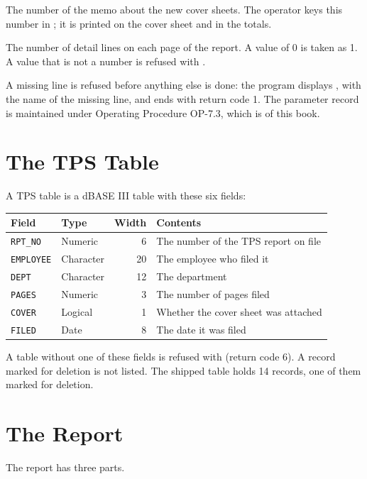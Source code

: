 The number of the memo about the new cover sheets.  The
operator keys this number in ; it is printed on the cover sheet
and in the totals.

The number of detail lines on each page of the report.
A value of 0 is taken as 1.  A value that is not a number is refused
with .

A missing line is refused before anything else is done: the program
displays , with the name of the missing line, and
ends with return code 1.  The parameter record is maintained under
Operating Procedure OP-7.3, which is  of this book.

\section{The TPS Table}
A TPS table is a dBASE III table with these six fields:

\begin{center}\small
\begin{tabular}{@{}llrp{46mm}@{}}
\rule{0pt}{10pt}\sffamily\bfseries Field & \sffamily\bfseries Type & \sffamily\bfseries Width & \sffamily\bfseries Contents\\\hline
\texttt{RPT\_NO} & Numeric & 6 & The number of the TPS report on file\\
\texttt{EMPLOYEE} & Character & 20 & The employee who filed it\\
\texttt{DEPT} & Character & 12 & The department\\
\texttt{PAGES} & Numeric & 3 & The number of pages filed\\
\texttt{COVER} & Logical & 1 & Whether the cover sheet was attached\\
\texttt{FILED} & Date & 8 & The date it was filed\\\hline
\end{tabular}\end{center}

A table without one of these fields is refused with 
(return code 6).  A record marked for deletion is not listed.  The shipped
table  holds 14 records, one of them marked for deletion.

\section{The Report}
The report has three parts.

